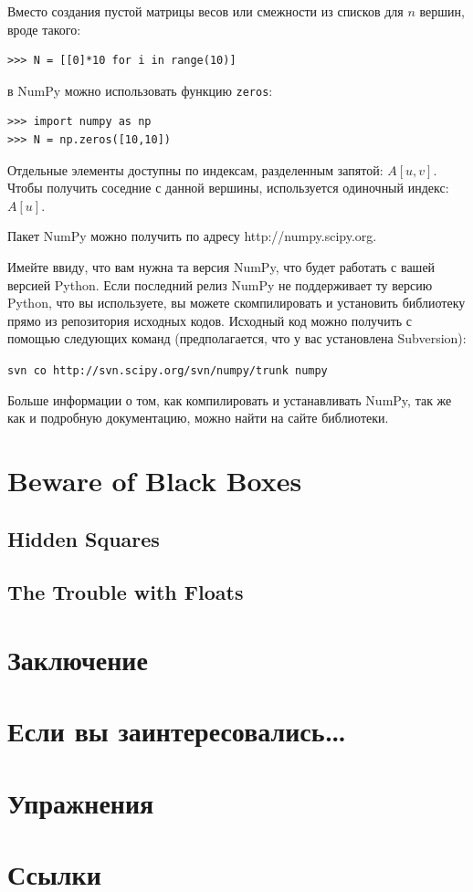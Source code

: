 Вместо создания пустой матрицы весов или смежности из списков для $n$ вершин, вроде такого:
\begin{lstlisting}
>>> N = [[0]*10 for i in range(10)]
\end{lstlisting}
в NumPy можно использовать функцию \texttt{zeros}:
\begin{lstlisting}
>>> import numpy as np
>>> N = np.zeros([10,10])
\end{lstlisting}

Отдельные элементы доступны по индексам, разделенным запятой: $A[u,v]$. Чтобы получить соседние с данной вершины, используется одиночный индекс: $A[u]$.

Пакет NumPy можно получить по адресу http://numpy.scipy.org.

Имейте ввиду, что вам нужна та версия NumPy, что будет работать с вашей версией Python. Если последний релиз NumPy не поддерживает ту версию Python, что вы используете, вы можете скомпилировать и установить библиотеку прямо из репозитория исходных кодов. Исходный код можно получить с помощью следующих команд (предполагается, что у вас установлена Subversion):

\texttt{svn co http://svn.scipy.org/svn/numpy/trunk numpy}

Больше информации о том, как компилировать и устанавливать NumPy, так же как и подробную документацию, можно найти на сайте библиотеки.

\section{Beware of Black Boxes}
\subsection{Hidden Squares}
\subsection{The Trouble with Floats}
\section{Заключение}
\section{Если вы заинтересовались…}
\section{Упражнения}
\section{Ссылки}





